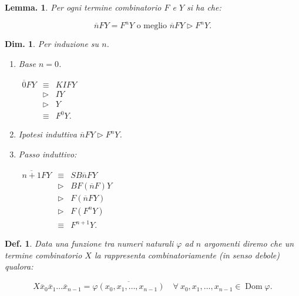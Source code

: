 \documentclass{book}
\newtheorem{definizione}{Def.}[chapter]
\newtheorem{lemma}{Lemma.}[chapter]
\newtheorem{dimostrazione}{Dim.}[chapter]
\newcommand*{\Dom}{\mathop{\mathrm{Dom}}\nolimits}
\begin{document}
\begin{lemma}
Per ogni termine combinatorio $F$ e $Y$ si ha che:

\[
\overline{n}FY = F^nY \text{ o meglio } \overline{n}FY \vartriangleright
 F^nY.
\]

\end{lemma}

\begin{dimostrazione}
Per induzione su $n$.

\begin{enumerate}

\item[$\bullet$]Base  $n = 0$.
  
$\begin{array}{lll}
    \overline{0}FY & \equiv & KIFY \\
                   & \vartriangleright & IY \\
                   & \vartriangleright & Y \\
                   & \equiv & F^0Y.
  \end{array}
$

\item[$\bullet$]Ipotesi induttiva $\overline{n}FY \vartriangleright F^nY$.
\item[$\bullet$]Passo induttivo:

$\begin{array}{lll}
    \overline{n+1}FY & \equiv & SB\overline{n}FY \\
                     & \vartriangleright & BF(\overline{n}F)Y \\
                     & \vartriangleright & F(\overline{n}FY) \\
                     & \vartriangleright & F(F^nY) \\
                     & \equiv & F^{n+1}Y.
  
  \end{array}
$

\end{enumerate}
 
\end{dimostrazione}

\begin{definizione}
Data una funzione tra numeri naturali $\varphi$ ad $n$ argomenti diremo che 
un termine combinatorio $X$ la \emph{rappresenta combinatoriamente (in senso 
debole)} qualora:

\[
X\overline{x}_0\overline{x}_1 \ldots \overline{x}_{n-1} = \overline{\varphi(x_0, x_1,  \ldots, x_{n-1})} \quad \forall \ 
x_0, x_1,  \ldots, x_{n-1} \in \Dom{\varphi}.
\]
\end{definizione}
\end{document}
